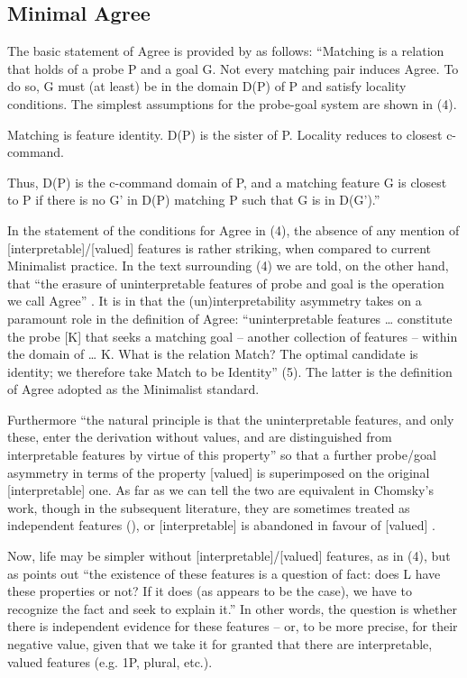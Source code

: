 \documentclass[output=paper]{langsci/langscibook}
\begin{document}
\subsection{Minimal Agree} %

The basic statement of Agree is provided by \citet[122]{Chomsky2000} as follows: “Matching is a relation that holds of a probe P and a goal G. Not every matching pair induces Agree. To do so, G must (at least) be in the domain D(P) of P and satisfy locality conditions. The simplest assumptions for the probe-goal system are shown in (4).

\ea%
    \label{ex:manzini:4}
    \ea Matching is feature identity.
    \ex D(P) is the sister of P.
    \ex Locality reduces to closest c-command. 
\z
\z

Thus, D(P) is the c-command domain of P, and a matching feature G is closest to P if there is no G' in D(P) matching P such that G is in D(G').” 

In the statement of the conditions for Agree in (4), the absence of any mention of [interpretable]/[valued] features is rather striking, when compared to current Minimalist practice. In the text surrounding (4) we are told, on the other hand, that “the erasure of uninterpretable features of probe and goal is the operation we call Agree” \citep[122]{Chomsky2000}. It is in \citet{Chomsky2001Derivation} that the (un)interpretability asymmetry takes on a paramount role in the definition of Agree: “uninterpretable features … constitute the probe [K] that seeks a matching goal – another collection of features – within the domain of … K. What is the relation Match? The optimal candidate is identity; we therefore take Match to be Identity” (5). The latter is the definition of Agree adopted as the Minimalist standard.

Furthermore “the natural principle is that the uninterpretable features, and only these, enter the derivation without values, and are distinguished from interpretable features by virtue of this property” so that a further probe\slash goal asymmetry in terms of the property [valued] is superimposed on the original [interpretable] one. As far as we can tell the two are equivalent in Chomsky’s work, though in the subsequent literature, they are sometimes treated as independent features (\citealt{Pesetsky2007}), or [interpretable] is abandoned in favour of [valued] \citep{Preminger2014}. 

 Now, life may be simpler without [interpretable]/[valued] features, as in (4), but as \citet[4]{Chomsky2001Derivation} points out “the existence of these features is a question of fact: does L have these properties or not? If it does (as appears to be the case), we have to recognize the fact and seek to explain it.” In other words, the question is whether there is independent evidence for these features – or, to be more precise, for their negative value, given that we take it for granted that there are interpretable, valued features (e.g. 1P, plural, etc.).
\end{document}
